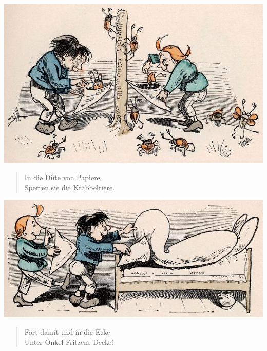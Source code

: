 \documentclass[a4paper,12pt]{article}
\begin{document}
\begin{center}\includegraphics[scale=.7, alt={... und in die Tüte}]{images/5-03.jpg}\end{center}



\begin{verse}
In die Düte von Papiere\\{}
Sperren sie die Krabbeltiere.
\end{verse}



\begin{center}\includegraphics[scale=.7, alt={Ab unter die Decke}]{images/5-04.jpg}\end{center}



\begin{verse}
Fort damit und in die Ecke\\{}
Unter Onkel Fritzens Decke!
\end{verse}
\end{document}
